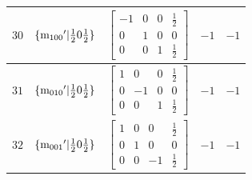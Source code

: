 \documentclass[fleqn,8pt]{jsarticle}
\begin{document}
\begin{longtable}{ccccc}
$ 30 $ & $ \{{\rm m}_{100}{}'|\frac{1}{2} 0 \frac{1}{2}\} $ & $ \begin{bmatrix} -1 & 0 & 0 & \frac{1}{2} \\ 0 & 1 & 0 & 0 \\ 0 & 0 & 1 & \frac{1}{2} \end{bmatrix} $ & $ -1 $ & $ -1 $ \\ \hline
$ 31 $ & $ \{{\rm m}_{010}{}'|\frac{1}{2} 0 \frac{1}{2}\} $ & $ \begin{bmatrix} 1 & 0 & 0 & \frac{1}{2} \\ 0 & -1 & 0 & 0 \\ 0 & 0 & 1 & \frac{1}{2} \end{bmatrix} $ & $ -1 $ & $ -1 $ \\ \hline
$ 32 $ & $ \{{\rm m}_{001}{}'|\frac{1}{2} 0 \frac{1}{2}\} $ & $ \begin{bmatrix} 1 & 0 & 0 & \frac{1}{2} \\ 0 & 1 & 0 & 0 \\ 0 & 0 & -1 & \frac{1}{2} \end{bmatrix} $ & $ -1 $ & $ -1 $ \\
\end{longtable}
\end{document}
